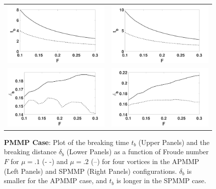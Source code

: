 \documentclass[a4paper,11pt]{article}
\begin{document}
\begin{figure}[!h]
\centering
\begin{tabular}{cc}
\includegraphics[width=.5\textwidth]{froude_comp_pmmp} & \includegraphics[width=.5\textwidth]{froude_comp_pmmp_sym}\\
\includegraphics[width=.5\textwidth]{zmb_pmmp} & \includegraphics[width=.5\textwidth]{zmb_pmmp_sym}
\end{tabular}
\caption{\small {\bf PMMP Case}: Plot of the breaking time $t_{b}$ (Upper Panels) and the breaking distance $\delta_{b}$ (Lower Panels) as a function of Froude number $F$ for $\mu=.1$ (- -) and $\mu=.2$ (--) for four vortices in the APMMP (Left Panels) and SPMMP (Right Panels) configurations.  $\delta_{b}$ is smaller for the APMMP case, and $t_{b}$ is longer in the SPMMP case.}
\label{fig:froudecomp_pmmp}
\end{figure}
\end{document}
